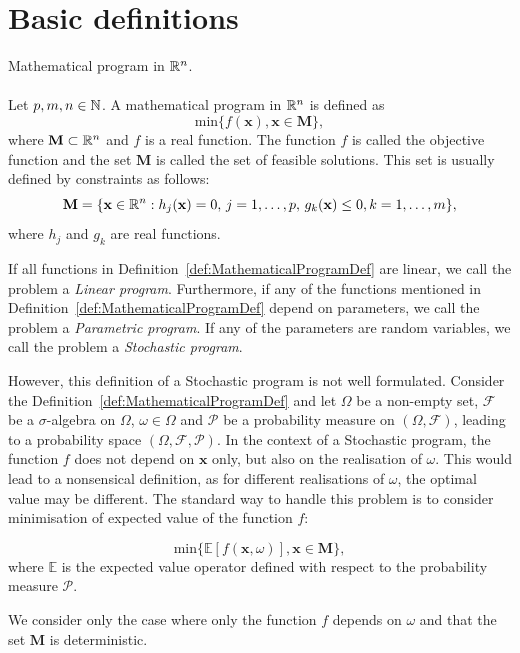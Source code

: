 \section{Basic definitions}
\begin{defn}{Mathematical program in $\mathbb{R}^n$}. \label{def:MathematicalProgramDef} \\
\cite[p. 107]{dupacovastochasticprogramming} \\
Let $p,m,n \in \mathbb{N}$. A mathematical program in $\mathbb{R}^n$ is defined as
\begin{equation*}
\mathrm{min} \{f(\mathbf{x}), \mathbf{x} \in \mathbf{M}\},
\end{equation*}
where $\mathbf{M} \subset \mathbb{R}^n$ and $f$ is a real function. The function $f$ is called the objective function and the set $\mathbf{M}$ is called the set of feasible solutions.
This set is usually defined by constraints as follows:
\begin{equation*}
	\mathbf{M} = \{\mathbf{x} \in \mathbb{R}^n: h_j(\mathbf{x})=0, \, j=1,\dots,p, \, g_k(\mathbf{x}) \leq 0, k=1,\dots,m \},
\end{equation*}
where $h_j$ and $g_k$ are real functions.
\end{defn}
If all functions in Definition~\ref{def:MathematicalProgramDef} are linear, we call the problem a \textit{Linear program}.
Furthermore, if any of the functions mentioned in Definition~\ref{def:MathematicalProgramDef} depend on parameters, we call the problem a \textit{Parametric program}. If any of the parameters are random variables, we call the problem a \textit{Stochastic program}.


However, this definition of a Stochastic program is not well formulated. Consider the Definition~\ref{def:MathematicalProgramDef} and let $\Omega$ be a non-empty set, $\mathcal{F}$ be a  $\sigma$-algebra on $\Omega$, $\omega \in \Omega$ and $\mathcal{P}$ be a probability measure on $(\Omega, \mathcal{F})$, leading to a probability space $(\Omega, \mathcal{F}, \mathcal{P})$. In the context of a Stochastic program, the function $f$ does not depend on $\mathbf{x}$ only, but also on the realisation of $\omega$. This would lead to a nonsensical definition, as for different realisations of $\omega$, the optimal value may be different. The standard way to handle this problem is to consider minimisation of expected value of the function $f$:

\begin{equation*}
\mathrm{min} \{\mathbb{E}\left[f(\mathbf{x}, \omega)\right], \mathbf{x} \in \mathbf{M}\},
\end{equation*}
where $\mathbb{E}$ is the expected value operator defined with respect to the probability measure $\mathcal{P}$. 
\begin{rem}
We consider only the case where only the function $f$ depends on $\omega$ and that the set $\mathbf{M}$ is deterministic.
\end{rem}



